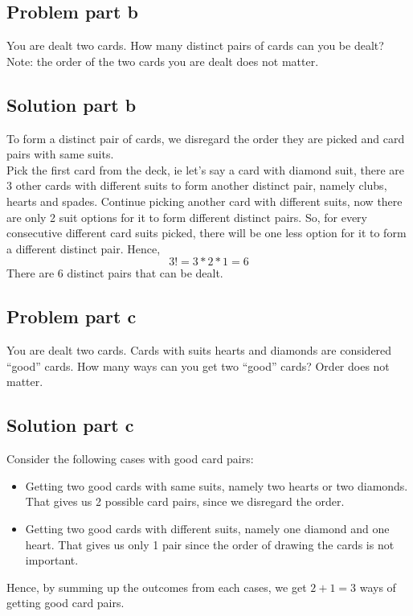 \documentclass[12pt]{article}%
\begin{document}
\subsection*{Problem part b}
You are dealt two cards. How many distinct pairs of cards can you be dealt? Note: the order of the two cards you are dealt does not matter.
\subsection*{Solution part b}
To form a distinct pair of cards, we disregard the order they are picked and card pairs with same suits. \\
Pick the first card from the deck, ie let's say a card with diamond suit, there are 3 other cards with different suits to form another distinct pair, namely clubs, hearts and spades. Continue picking another card with different suits, now there are only 2 suit options for it to form different distinct pairs. So, for every consecutive different card suits picked, there will be one less option for it to form a different distinct pair. Hence, 
\begin{equation}
3! = 3 * 2 * 1 = 6
\end{equation} 
There are 6 distinct pairs that can be dealt. 

\subsection*{Problem part c}
You are dealt two cards. Cards with suits hearts and diamonds are considered “good” cards. How many ways can you get two “good” cards? Order does not matter.
\subsection*{Solution part c}
Consider the following cases with good card pairs:
\begin{itemize}
	\item Getting two good cards with same suits, namely two hearts or two diamonds. That gives us 2 possible card pairs, since we disregard the order.
	\item Getting two good cards with different suits, namely one diamond and one heart. That gives us only 1 pair since the order of drawing the cards is not important.
\end{itemize}
Hence, by summing up the outcomes from each cases, we get \begin{math}2+1=3\end{math} ways of getting good card pairs.
\end{document}
